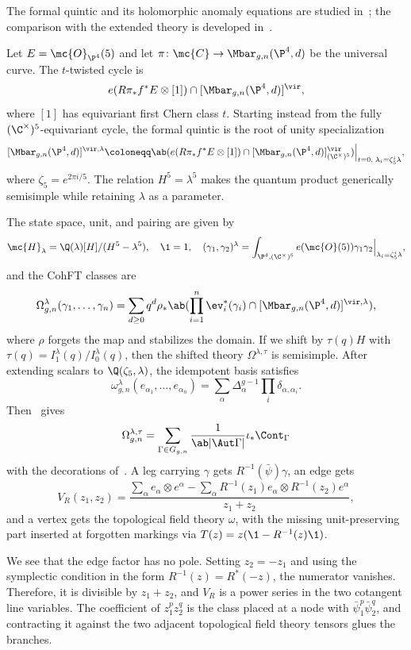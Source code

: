 The formal quintic and its holomorphic anomaly equations are studied in~\cite{LhoPandharipande2019}; the comparison with the extended theory is developed in~\cite{GJRstructure}.

Let \(E = \mc{O}_{\P^4}(5)\) and let \(\pi \colon \mc{C} \to \Mbar_{g,n}(\P^4,d)\) be the universal curve. The \(t\)-twisted cycle is
\[ e(R\pi_* f^* E \otimes [1]) \cap [\Mbar_{g,n}(\P^4,d)]^{\vir}, \]
where \([1]\) has equivariant first Chern class \(t\). Starting instead from the fully \((\C^{\times})^5\)-equivariant cycle, the formal quintic is the root of unity specialization
\[ [\Mbar_{g,n}(\P^4,d)]^{\vir,\lambda} \coloneqq \ab( e(R\pi_*f^*E \otimes [1]) \cap [\Mbar_{g,n}(\P^4,d)]^{\vir}_{(\C^{\times})^5})\Big|_{t=0, \; \lambda_i = \zeta_5^i \lambda}, \]
where \(\zeta_5 = e^{2\pi i/5}\). The relation \(H^5 = \lambda^5\) makes the quantum product generically semisimple while retaining \(\lambda\) as a parameter.

The state space, unit, and pairing are given by
\[ \mc{H}_{\lambda} = \Q(\lambda)[H]/(H^5-\lambda^5), \quad \1 = 1, \quad (\gamma_1,\gamma_2)^{\lambda} = \int_{\P^4, (\C^{\times})^5} e(\mc{O}(5))\gamma_1\gamma_2 \Big|_{\lambda_i = \zeta_5^i\lambda}, \]
and the CohFT classes are
\[ \Omega^{\lambda}_{g,n}(\gamma_1, \ldots, \gamma_n) = \sum_{d \geq 0} q^d \rho_* \ab( \prod_{i=1}^n \ev_i^*(\gamma_i) \cap [\Mbar_{g,n}(\P^4,d)]^{\vir,\lambda}), \]
where \(\rho\) forgets the map and stabilizes the domain. If we shift by \(\tau(q)H\) with \(\tau(q) = I^{\lambda}_1(q)/I^{\lambda}_0(q)\), then the shifted theory \(\Omega^{\lambda,\tau}\) is semisimple. After extending scalars to \(\Q(\zeta_5,\lambda)\), the idempotent basis satisfies
\[ \omega^{\lambda}_{g,n}(e_{\alpha_1}, \ldots, e_{\alpha_n}) = \sum_{\alpha}\Delta_{\alpha}^{g-1}\prod_i \delta_{\alpha,\alpha_i}. \]
Then~ gives
\[ \Omega^{\lambda,\tau}_{g,n} = \sum_{\Gamma \in G_{g,n}} \frac{1}{\ab|\Aut\Gamma|}\iota_* \Cont_{\Gamma} \]
with the decorations of~. A leg carrying \(\gamma\) gets \(R^{-1}(\bar{\psi})\gamma\), an edge gets
\[ V_R(z_1,z_2) = \frac{\sum_{\alpha} e_{\alpha}\otimes e^{\alpha} - \sum_{\alpha} R^{-1}(z_1)e_{\alpha} \otimes R^{-1}(z_2)e^{\alpha}}{z_1+z_2}, \]
and a vertex gets the topological field theory \(\omega\), with the missing unit-preserving part inserted at forgotten markings via \(T(z) = z(\1 - R^{-1}(z)\1)\).

\begin{rmk}
    We see that the edge factor has no pole. Setting \(z_2 = -z_1\) and using the symplectic condition in the form \(R^{-1}(z) = R^*(-z)\), the numerator vanishes. Therefore, it is divisible by \(z_1+z_2\), and \(V_R\) is a power series in the two cotangent line variables. The coefficient of \(z_1^p z_2^q\) is the class placed at a node with \(\bar{\psi}_1^p \bar{\psi}_2^q\), and contracting it against the two adjacent topological field theory tensors glues the branches.
\end{rmk}

